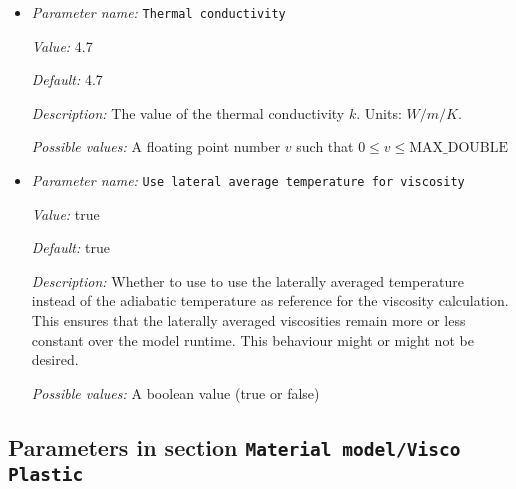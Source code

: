 \begin{itemize}
{\it Value:} 1e23


{\it Default:} 1e23


{\it Description:} The reference viscosity that is used for pressure scaling. 


{\it Possible values:} A floating point number $v$ such that $0 \leq v \leq \text{MAX\_DOUBLE}$
\item {\it Parameter name:} {\tt Thermal conductivity}
\label{parameters:Material model/Steinberger model/Thermal conductivity}


{\it Value:} 4.7


{\it Default:} 4.7


{\it Description:} The value of the thermal conductivity $k$. Units: $W/m/K$.


{\it Possible values:} A floating point number $v$ such that $0 \leq v \leq \text{MAX\_DOUBLE}$
\item {\it Parameter name:} {\tt Use lateral average temperature for viscosity}
\label{parameters:Material model/Steinberger model/Use lateral average temperature for viscosity}


{\it Value:} true


{\it Default:} true


{\it Description:} Whether to use to use the laterally averaged temperature instead of the adiabatic temperature as reference for the viscosity calculation. This ensures that the laterally averaged viscosities remain more or less constant over the model runtime. This behaviour might or might not be desired.


{\it Possible values:} A boolean value (true or false)
\end{itemize}

\subsection{Parameters in section \tt Material model/Visco Plastic}
\label{parameters:Material_20model/Visco_20Plastic}

